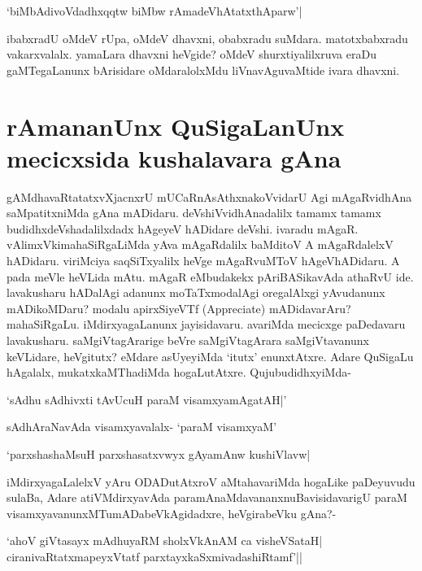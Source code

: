 \begin{shloka} 
`biMbAdivoVdadhxqqtw biMbw rAmadeVhAtatxthAparw'|\label{167b}
\end{shloka} 

ibabxradU oMdeV rUpa, oMdeV dhavxni, obabxradu suMdara. matotxbabxradu vakarxvalalx. yamaLara dhavxni heVgide? oMdeV shurxtiyalilxruva eraDu gaMTegaLanunx bArisidare oMdaralolxMdu liVnavAguvaMtide ivara dhavxni. 

\section*{rAmananUnx QuSigaLanUnx mecicxsida kushalavara gAna} 

gAMdhavaRtatatxvXjacnxrU mUCaRnAsAthxnakoVvidarU Agi mAgaRvidhAna saMpatitxniMda gAna mADidaru. deVshiVvidhAnadalilx tamamx tamamx budidhxdeVshadalilxdadx hAgeyeV hADidare deVshi. ivaradu mAgaR. vAlimxVkimahaSiRgaLiMda yAva mAgaRdalilx baMditoV A mAgaRdalelxV hADidaru. viriMciya saqSiTxyalilx heVge mAgaRvuMToV hAgeVhADidaru. A pada meVle heVLida mAtu. mAgaR eMbudakekx pAriBASikavAda athaRvU ide. lavakusharu hADalAgi adanunx moTaTxmodalAgi oregalAlxgi yAvudanunx mADikoMDaru? modalu apirxSiyeVTf ({\eng Appreciate}) mADidavarAru? mahaSiRgaLu. iMdirxyagaLanunx jayisidavaru. avariMda mecicxge paDedavaru lavakusharu. saMgiVtagArarige beVre saMgiVtagArara saMgiVtavanunx keVLidare, heVgitutx? eMdare asUyeyiMda `itutx' enunxtAtxre. Adare QuSigaLu hAgalalx, mukatxkaMThadiMda hogaLutAtxre. QujubudidhxyiMda- 

\begin{shloka} 
`sAdhu sAdhivxti tAvUcuH paraM visamxyamAgatAH|'\label{168f}
\end{shloka} 

sAdhAraNavAda visamxyavalalx- `paraM visamxyaM' 

\begin{shloka} 
`parxshashaMsuH parxshasatxvwyx gAyamAnw kushiVlavw|\label{168}
\end{shloka} 

iMdirxyagaLalelxV yAru ODADutAtxroV aMtahavariMda hogaLike paDeyuvudu sulaBa, Adare atiVMdirxyavAda paramAnaMdavananxnuBavisidavarigU paraM visamxyavanunxMTumADabeVkAgidadxre, heVgirabeVku gAna?- 

\begin{shloka} 
`ahoV giVtasayx mAdhuyaRM sholxVkAnAM ca visheVSataH|\\ 
ciranivaRtatxmapeyxVtatf parxtayxkaSxmivadashiRtamf'||
\end{shloka} 

